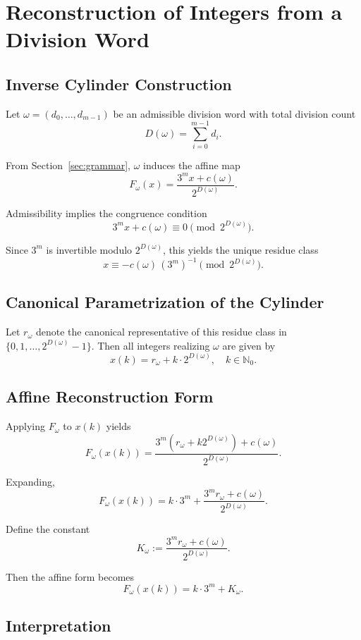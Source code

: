 \documentclass[12pt, oneside]{article}   	%
\numberwithin{equation}{section}          %
\theoremstyle{definition}
\begin{document}
\newpage
\section{Reconstruction of Integers from a Division Word}
\label{app:reconstruction}

\subsection{Inverse Cylinder Construction}

Let $\omega = (d_0,\dots,d_{m-1})$ be an admissible division word with total division count
\[
D(\omega) = \sum_{i=0}^{m-1} d_i.
\]

From Section~\ref{sec:grammar}, $\omega$ induces the affine map
\[
F_\omega(x) = \frac{3^m x + c(\omega)}{2^{D(\omega)}}.
\]

Admissibility implies the congruence condition
\[
3^m x + c(\omega) \equiv 0 \pmod{2^{D(\omega)}}.
\]

Since $3^m$ is invertible modulo $2^{D(\omega)}$, this yields the unique residue class
\[
x \equiv -c(\omega)\,(3^m)^{-1} \pmod{2^{D(\omega)}}.
\]

\subsection{Canonical Parametrization of the Cylinder}

Let $r_\omega$ denote the canonical representative of this residue class in
$\{0,1,\dots,2^{D(\omega)}-1\}$. Then all integers realizing $\omega$ are given by
\[
x(k) = r_\omega + k\cdot 2^{D(\omega)}, \quad k \in \mathbb{N}_0.
\]

\subsection{Affine Reconstruction Form}

Applying $F_\omega$ to $x(k)$ yields
\[
F_\omega(x(k))
= \frac{3^m (r_\omega + k2^{D(\omega)}) + c(\omega)}{2^{D(\omega)}}.
\]

Expanding,
\[
F_\omega(x(k))
= k\cdot 3^m + \frac{3^m r_\omega + c(\omega)}{2^{D(\omega)}}.
\]

Define the constant
\[
K_\omega := \frac{3^m r_\omega + c(\omega)}{2^{D(\omega)}}.
\]

Then the affine form becomes
\[
F_\omega(x(k)) = k\cdot 3^m + K_\omega.
\]

\subsection{Interpretation}
\end{document}
